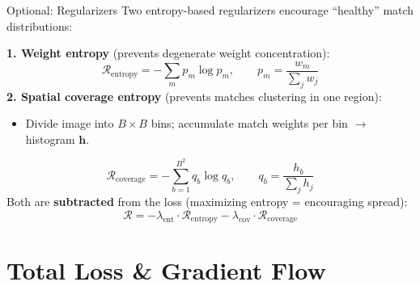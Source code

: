 \documentclass[aspectratio=169, 12pt]{beamer}
\begin{document}
\begin{frame}{Optional: Regularizers}
\small
Two entropy-based regularizers encourage ``healthy'' match distributions:

\smallskip
\textbf{1. Weight entropy} (prevents degenerate weight concentration):
\vspace{-0.3em}
\[
    \mathcal{R}_{\mathrm{entropy}} = -\sum_m p_m \log p_m, \qquad p_m = \frac{w_m}{\sum_j w_j}
\]
\vspace{-0.5em}
\textbf{2. Spatial coverage entropy} (prevents matches clustering in one region):
\begin{itemize}\setlength{\itemsep}{0pt}
    \item Divide image into $B \times B$ bins; accumulate match weights per bin $\rightarrow$ histogram $\mathbf{h}$.
\end{itemize}
\vspace{-0.3em}
\[
    \mathcal{R}_{\mathrm{coverage}} = -\sum_{b=1}^{B^2} q_b \log q_b,
    \qquad q_b = \frac{h_b}{\sum_j h_j}
\]
\vspace{-0.5em}
Both are \textbf{subtracted} from the loss (maximizing entropy = encouraging spread):
\vspace{-0.3em}
\[
    \mathcal{R} = -\lambda_{\mathrm{ent}} \cdot \mathcal{R}_{\mathrm{entropy}}
               - \lambda_{\mathrm{cov}} \cdot \mathcal{R}_{\mathrm{coverage}}
\]
\end{frame}

\section{Total Loss \& Gradient Flow}
\end{document}
